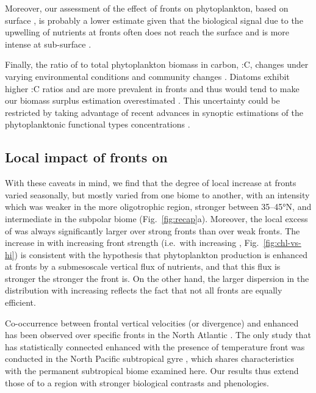 Moreover, our assessment of the effect of fronts on phytoplankton, based on surface , is probably a lower estimate given that the biological signal due to the upwelling of nutrients at fronts often does not reach the surface and is more intense at sub-surface \parencite{mourino_2004, ruiz_2019}.

Finally, the ratio of  to total phytoplankton biomass in carbon, :C, changes under varying environmental conditions and community changes \parencite{behrenfeld_2015, halsey_2015, inomura_2022}.
Diatoms exhibit higher :C ratios and are more prevalent in fronts and thus would tend to make our biomass surplus estimation overestimated \parencite{treguer_2018}.
This uncertainty could be restricted by taking advantage of recent advances in synoptic estimations of the phytoplanktonic functional types concentrations \parencite{elhourany_2019}.

\subsection{Local impact of fronts on }

With these caveats in mind, we find that the degree of local  increase at fronts varied seasonally, but mostly varied from one biome to another, with an intensity which was weaker in the more oligotrophic region, stronger between 35--45°N, and intermediate in the subpolar biome (Fig.~\ref{fig:recap}a).
Moreover, the local excess of  was always significantly larger over strong fronts than over weak fronts.
The increase in  with increasing front strength (i.e.\ with increasing , Fig.~\ref{fig:chl-vs-hi}) is consistent with the hypothesis that phytoplankton production is enhanced at fronts by a submesoscale vertical flux of nutrients, and that this flux is stronger the stronger the front is.
On the other hand, the larger dispersion in the  distribution with increasing  reflects the fact that not all fronts are equally efficient.

Co-occurrence between frontal vertical velocities (or divergence) and enhanced  has been observed over specific fronts in the North Atlantic \parencite{mourino_2004, allen_2005, lehahn_2007}.
The only study that has statistically connected enhanced  with the presence of temperature front was conducted in the North Pacific subtropical gyre \parencite{liu_2016}, which shares characteristics with the permanent subtropical biome examined here.
Our results thus extend those of \textcite{liu_2016} to a region with stronger biological contrasts and phenologies.

